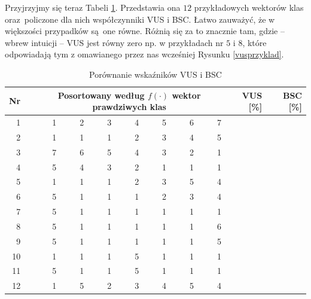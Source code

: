 \documentclass{mini}
\begin{document}
Przyjrzyjmy się teraz Tabeli \ref{bsc}. Przedstawia ona $12$ przykładowych wektorów klas oraz~policzone dla nich współczynniki VUS i BSC. Łatwo zauważyć, że w większości przypadków są~one równe. Różnią się za to znacznie tam, gdzie -- wbrew intuicji -- VUS jest równy zero np. w przykładach nr $5$ i $8$, które odpowiadają tym z omawianego przez nas wcześniej Rysunku \ref{vusprzyklad}. 

\begin{table}[ht]
\centering
\begin{tabular}{rrrrrrrrrrr}
  \hline
Nr && \multicolumn{7}{c}{\parbox{4cm}{\centering\vspace{2mm}Posortowany według $f(\cdot)$ wektor prawdziwych klas\vspace{2mm}}}   & VUS [\%] & BSC [\%] \\ 
  \hline
1&&  1 &   2 &   3 &   4 &   5 &   6 &   7 & \color{red}{100,00} & \color{blue}{100.00} \\ 
2& &   1 &   1 &   1 &   2 &   3 &   4 &   5 & \color{red}{100,00} & \color{blue}{100,00} \\ 
3& &   7 &   6 &   5 &   4 &   3 &   2 &   1 & \color{red}{0,00} & \color{blue}{0,00} \\ 
4& &   5 &   4 &   3 &   2 &   1 &   1 &   1 & \color{red}{0,00} & \color{blue}{0,00} \\ 
5& &   1 &   1 &   1 &   2 &   3 &   5 &   4 & \color{red}{0,00} & \color{blue}{94,44} \\ 
6&&    5 &   1 &   1 &   1 &   2 &   3 &   4 & \color{red}{0,00} & \color{blue}{66,67} \\ 
7& &   5 &   1 &   1 &   1 &   1 &   1 &   1 & \color{red}{0,00} & \color{blue}{0,00} \\ 
8& &   5 &   1 &   1 &   1 &   1 &   1 &   6 & \color{red}{0,00} & \color{blue}{54,55} \\ 
9&&    5 &   1 &   1 &   1 &   1 &   1 &   5 & \color{red}{50,00} & \color{blue}{50,00} \\ 
10&&    1 &   1 &   1 &   5 &   1 &   1 &   1 & \color{red}{50,00} & \color{blue}{50,00} \\ 
11& &   5 &   1 &   1 &   5 &   1 &   1 &   1 & \color{red}{20,00} & \color{blue}{20,00} \\ 
12&&    1 &   5 &   2 &   3 &   4 &   5 &   4 & \color{red}{25,00} & \color{blue}{73,68} \\ 
   \hline
\end{tabular}
\caption{Porównanie wskaźników VUS i BSC}
\label{bsc}
\end{table}
\end{document}

